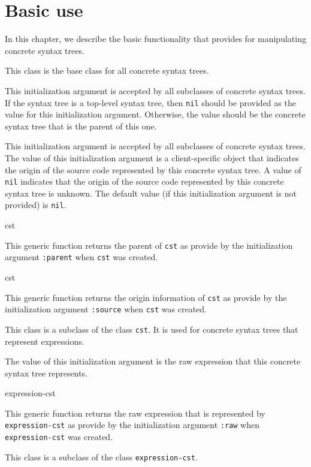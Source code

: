 \chapter{Basic use}

In this chapter, we describe the basic functionality that \sysname{}
provides for manipulating concrete syntax trees.


This class is the base class for all concrete syntax trees.


This initialization argument is accepted by all subclasses of concrete
syntax trees.  If the syntax tree is a top-level syntax tree, then
\texttt{nil} should be provided as the value for this initialization
argument.  Otherwise, the value should be the concrete syntax tree
that is the parent of this one.


This initialization argument is accepted by all subclasses of concrete
syntax trees.  The value of this initialization argument is a
client-specific object that indicates the origin of the source code
represented by this concrete syntax tree.  A value of \texttt{nil}
indicates that the origin of the source code represented by this concrete
syntax tree is unknown.  The default value (if this initialization
argument is not provided) is \texttt{nil}.

 {cst}

This generic function returns the parent of \texttt{cst} as provide by
the initialization argument \texttt{:parent} when \texttt{cst} was
created.

 {cst}

This generic function returns the origin information of \texttt{cst}
as provide by the initialization argument \texttt{:source} when
\texttt{cst} was created.


This class is a subclass of the class \texttt{cst}.  It is used for
concrete syntax trees that represent \commonlisp{} expressions.


The value of this initialization argument is the raw \commonlisp{}
expression that this concrete syntax tree represents.

 {expression-cst}

This generic function returns the raw \commonlisp{} expression that is
represented by \texttt{expression-cst} as provide by the
initialization argument \texttt{:raw} when \texttt{expression-cst} was
created.


This class is a subclass of the class \texttt{expression-cst}.
